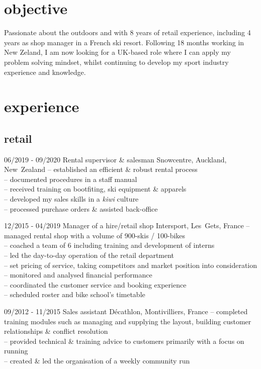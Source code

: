 \documentclass[a4paper]{farangoth-cv}
\begin{document}
\vspace{2.2\parskip}
\section{objective}
Passionate about the outdoors and with 8 years of retail experience, including 4 years as shop manager in a French ski resort. Following 18 months working in New Zeland, I am now looking for a UK-based role where I can apply my problem solving mindset, whilst continuing to develop my sport industry experience and knowledge.

\section{experience}
\subsection{retail}
\begin{entrylist}
  \entry%
  {06/2019 \-- 09/2020}
  {Rental supervisor \& salesman}
  {Snowcentre, \mbox{Auckland}, \mbox{New Zealand}}
  {
    \--- established an efficient \& robust rental process\\
    \--- documented  procedures in a staff manual\\
    \--- received training on bootfiting, ski equipment \& apparels\\
    \--- developed my sales skills in a \emph{kiwi} culture\\
    \--- processed purchase orders \& assisted back-office
  }
  
  \entry%
  {12/2015 \-- 04/2019}
  {Manager of a hire/retail shop}
  {Intersport, \mbox{Les Gets}, \mbox{France}}
  {
    \--- managed rental shop with a volume of 900-skis / 100-bikes\\
    \--- coached a team of 6 including training and development of interns\\
    \--- led the day-to-day operation of the retail department\\
    \--- set pricing of service, taking competitors and market position into consideration\\
    \--- monitored and analysed financial performance\\
    \--- coordinated the customer service and booking experience\\
    \--- scheduled roster and bike school's timetable
  }

  \entry%
  {09/2012 \-- 11/2015}
  {Sales assistant}
  {Décathlon, \mbox{Montivilliers}, \mbox{France}}
  {%
    \--- completed training modules such as managing and supplying the layout, building customer relationships \& conflict resolution\\
    \--- provided technical \& training advice to customers primarily with a focus on running\\
    \--- created \& led the organisation of a weekly community run
  }
\end{entrylist}
\end{document}
